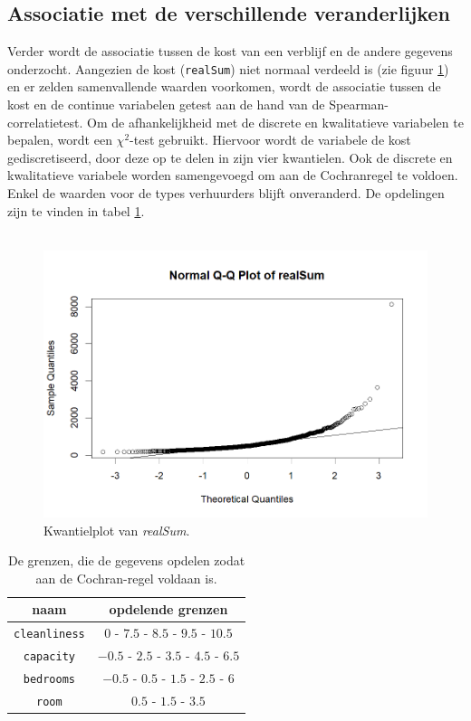 \documentclass[a4paper]{kulakarticle}
\begin{document}
	\subsection{Associatie met de verschillende veranderlijken}
	
	Verder wordt de associatie tussen de kost van een verblijf en de andere gegevens onderzocht. Aangezien de kost (\verb|realSum|) niet normaal verdeeld is (zie figuur \ref{fig:qqplotvrealsum}) en er zelden samenvallende waarden voorkomen, wordt de associatie tussen de kost en de continue variabelen getest aan de hand van de Spearman-correlatietest. Om de afhankelijkheid met de discrete en kwalitatieve variabelen te bepalen, wordt een $\chi ^2$-test gebruikt. Hiervoor wordt de variabele de kost gediscretiseerd, door deze op te delen in zijn vier kwantielen. Ook de discrete en kwalitatieve variabele worden samengevoegd om aan de Cochranregel te voldoen. Enkel de waarden voor de types verhuurders blijft onveranderd. De opdelingen zijn te vinden in tabel \ref{tab:grenzen}. \\\\
	
	\begin{figure}
		\centering
		\includegraphics[width=0.7\linewidth]{Figuren/qqplotvrealSum}
		\caption{Kwantielplot van \textit{realSum}.}
		\label{fig:qqplotvrealsum}
	\end{figure}

	\begin{table}[h]
		\centering
			\begin{tabular}{c|c}
			\centering
			naam& opdelende grenzen\\
			\hline
			\verb*|cleanliness| & $ 0 $ - $ 7.5 $ - $ 8.5$ - $ 9.5 $ - $ 10.5$ \\
			\verb*|capacity|& $-0.5$ - $2.5$ - $3.5$ - $4.5$ - $6.5$\\
			\verb*|bedrooms|& $-0.5$ - $0.5$ - $1.5$ - $2.5$ - $6$\\
			\verb*|room| & $0.5$ - $1.5$ - $3.5$\\
			\end{tabular}
			\caption{De grenzen, die de gegevens opdelen zodat aan de Cochran-regel voldaan is.}
			\label{tab:grenzen}
	\end{table}
\end{document}
